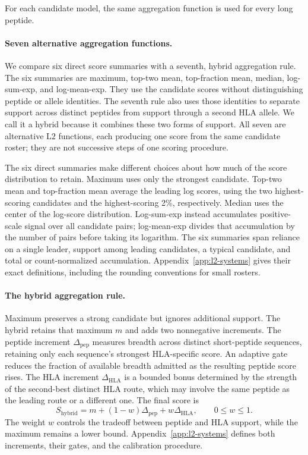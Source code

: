 \documentclass[11pt]{article}
\begin{document}
For each candidate model, the same aggregation function is used for every
long peptide.

\paragraph{Seven alternative aggregation functions.}
We compare six direct score summaries with a seventh, hybrid aggregation
rule. The six summaries are maximum, top-two mean, top-fraction mean, median,
log-sum-exp, and log-mean-exp. They use the candidate scores without
distinguishing peptide or allele identities. The seventh rule also uses those
identities to separate support across distinct peptides from support through
a second HLA allele. We call it a hybrid because it combines these two forms
of support. All seven are alternative \(\mathrm{L2}\) functions, each
producing one score from the same candidate roster; they are not successive
steps of one scoring procedure.

The six direct summaries make different choices about how much of the score
distribution to retain. Maximum uses only the strongest candidate. Top-two
mean and top-fraction mean average the leading log scores, using the two
highest-scoring candidates and the highest-scoring 2\%, respectively. Median
uses the center of the log-score distribution. Log-sum-exp instead accumulates
positive-scale signal over all candidate pairs; log-mean-exp divides that
accumulation by the number of pairs before taking its logarithm. The six
summaries span reliance on a single leader, support among leading
candidates, a typical candidate, and total or count-normalized accumulation.
Appendix~\ref{app:l2-systems} gives their exact definitions, including the
rounding conventions for small rosters.

\paragraph{The hybrid aggregation rule.}
Maximum preserves a strong candidate but ignores additional support. The
hybrid retains that maximum \(m\) and adds two nonnegative increments.
The peptide increment \(\Delta_{\mathrm{pep}}\) measures breadth across
distinct short-peptide sequences, retaining only each sequence's strongest
HLA-specific score. An adaptive gate reduces the fraction of available
breadth admitted as the resulting peptide score rises. The HLA increment
\(\Delta_{\mathrm{HLA}}\) is a bounded bonus determined by the strength of
the second-best distinct HLA route, which may involve the same peptide as the
leading route or a different one. The final score is
\[
S_{\mathrm{hybrid}}
=m+(1-w)\Delta_{\mathrm{pep}}+w\Delta_{\mathrm{HLA}},
\qquad 0\leq w\leq1.
\]
The weight \(w\) controls the tradeoff between peptide and HLA support,
while the maximum remains a lower bound. Appendix~\ref{app:l2-systems}
defines both increments, their gates, and the calibration procedure.
\end{document}
